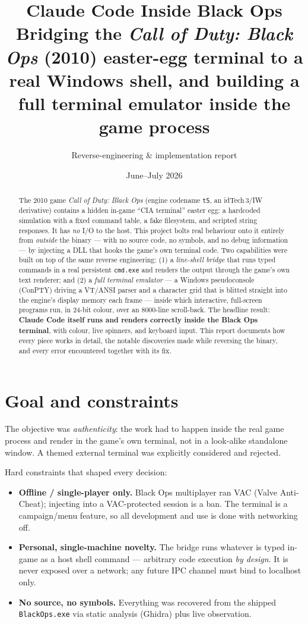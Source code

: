 \documentclass[11pt]{article}
\title{\textbf{Claude Code Inside Black Ops}\\[4pt]
\large Bridging the \emph{Call of Duty: Black Ops} (2010) easter-egg terminal to a
real Windows shell, and building a full terminal emulator inside the game process}
\author{Reverse-engineering \& implementation report}
\date{June--July 2026}
\begin{document}
\maketitle

\begin{abstract}
\noindent
The 2010 game \emph{Call of Duty: Black Ops} (engine codename \texttt{t5}, an
idTech\,3/IW derivative) contains a hidden in-game ``CIA terminal'' easter egg: a
hardcoded simulation with a fixed command table, a fake filesystem, and scripted
string responses. It has \emph{no} I/O to the host. This project bolts real
behaviour onto it entirely from \emph{outside} the binary --- with no source code,
no symbols, and no debug information --- by injecting a DLL that hooks the game's
own terminal code. Two capabilities were built on top of the same reverse
engineering: (1) a \emph{line-shell bridge} that runs typed commands in a real
persistent \texttt{cmd.exe} and renders the output through the game's own text
renderer; and (2) a \emph{full terminal emulator} --- a Windows pseudoconsole
(ConPTY) driving a VT/ANSI parser and a character grid that is blitted straight into
the engine's display memory each frame --- inside which interactive, full-screen
programs run, in 24-bit colour, over an 8000-line scroll-back. The headline result:
\textbf{Claude Code itself runs and renders correctly inside the Black Ops terminal},
with colour, live spinners, and keyboard input. This report documents how every piece
works in detail, the notable discoveries made while reversing the binary, and every
error encountered together with its fix.
\end{abstract}

\tableofcontents

\section{Goal and constraints}

The objective was \emph{authenticity}: the work had to happen inside the real game
process and render in the game's own terminal, not in a look-alike standalone
window. A themed external terminal was explicitly considered and rejected.

Hard constraints that shaped every decision:

\begin{itemize}[nosep]
  \item \textbf{Offline / single-player only.} Black Ops multiplayer ran VAC
  (Valve Anti-Cheat); injecting into a VAC-protected session is a ban. The terminal
  is a campaign/menu feature, so all development and use is done with networking off.
  \item \textbf{Personal, single-machine novelty.} The bridge runs whatever is typed
  in-game as a host shell command --- arbitrary code execution \emph{by design}. It
  is never exposed over a network; any future IPC channel must bind to localhost only.
  \item \textbf{No source, no symbols.} Everything was recovered from the shipped
  \texttt{BlackOps.exe} via static analysis (Ghidra) plus live observation.
\end{itemize}
\end{document}
